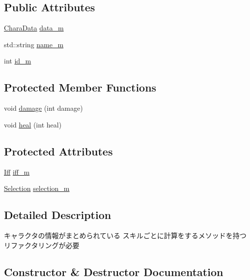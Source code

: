 \subsection*{Public Attributes}
\begin{DoxyCompactItemize}
\item 
\hyperlink{struct_chara_data}{Chara\+Data} \hyperlink{class_character_abdd384831f34238538de88709016afe8}{data\+\_\+m}
\item 
std\+::string \hyperlink{class_character_ae84b80fb6ac2e9271506c84b71d657f6}{name\+\_\+m}
\item 
int \hyperlink{class_character_a5e51ea77e9178ae99a33901300e4bc40}{id\+\_\+m}
\end{DoxyCompactItemize}
\subsection*{Protected Member Functions}
\begin{DoxyCompactItemize}
\item 
void \hyperlink{class_character_a611be438cc7a4fa5b9b4d50236a2966b}{damage} (int damage)
\item 
void \hyperlink{class_character_a84c4b8b6ed92e7b373b36a3fc17f5bf5}{heal} (int heal)
\end{DoxyCompactItemize}
\subsection*{Protected Attributes}
\begin{DoxyCompactItemize}
\item 
\hyperlink{_character_8h_a2c0364e3d1fbdb7881a87792637f65f8}{Iff} \hyperlink{class_character_a2ca852f598c4e20b5d932355379c4ac0}{iff\+\_\+m}
\item 
\hyperlink{struct_selection}{Selection} \hyperlink{class_character_a55ee12bd3ec2b766fb3cbe20c3333fe6}{selection\+\_\+m}
\end{DoxyCompactItemize}


\subsection{Detailed Description}
キャラクタの情報がまとめられている スキルごとに計算をするメソッドを持つ リファクタリングが必要 

\subsection{Constructor \& Destructor Documentation}
\hypertarget{class_character_abcabc54ae5d60699204c5db2484fc116}{}
